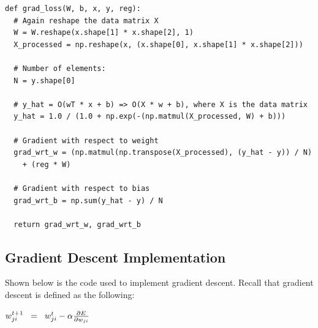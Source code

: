 \documentclass[12pt]{article}
\begin{document}
\begin{verbatim}
def grad_loss(W, b, x, y, reg):
  # Again reshape the data matrix X
  W = W.reshape(x.shape[1] * x.shape[2], 1)
  X_processed = np.reshape(x, (x.shape[0], x.shape[1] * x.shape[2]))

  # Number of elements:
  N = y.shape[0]

  # y_hat = O(wT * x + b) => O(X * w + b), where X is the data matrix
  y_hat = 1.0 / (1.0 + np.exp(-(np.matmul(X_processed, W) + b)))

  # Gradient with respect to weight
  grad_wrt_w = (np.matmul(np.transpose(X_processed), (y_hat - y)) / N) 
    + (reg * W)
    
  # Gradient with respect to bias
  grad_wrt_b = np.sum(y_hat - y) / N

  return grad_wrt_w, grad_wrt_b
    \end{verbatim}

\subsection{Gradient Descent Implementation}
Shown below is the code used to implement gradient descent. Recall that gradient descent is defined as the following:
\begin{center}
  $w_{ji}^{t+1} \hspace{2mm} = \hspace{2mm} w_{ji}^t - \alpha \frac{\partial E}{\partial w_{ji}}$
\end{center}
\end{document}
